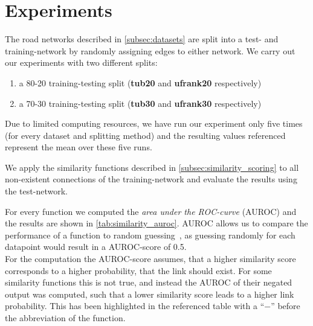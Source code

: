 \documentclass[12pt,a4paper]{IEEEtran}
\newcommand{\n}{\ensuremath{-}}
\begin{document}
\section{Experiments}

The road networks described in \autoref{subsec:datasets} are split into a
test- and training-network by randomly assigning edges to either network.
We carry out our experiments with two different splits:
\begin{enumerate}
\item a 80-20 training-testing split (\textbf{tub20} and \textbf{ufrank20} respectively)
\item a 70-30 training-testing split (\textbf{tub30} and \textbf{ufrank30} respectively)
\end{enumerate}
Due to limited computing resources, we have run our experiment only five times
(for every dataset and splitting method) and the resulting values
referenced represent the mean over these five runs.

We apply the similarity functions described in \autoref{subsec:similarity_scoring}
to all non-existent connections of the training-network and evaluate the results using the test-network.

For every function we computed the \emph{area under the ROC-curve} (AUROC) and the results are shown in \autoref{tab:similarity_auroc}.
AUROC allows us to compare the performance of a function to random guessing~\cite[see][40]{informedness},
as guessing randomly for each datapoint would result in a AUROC-score of 0.5.\\
For the computation the AUROC-score assumes,
that a higher similarity score corresponds to a higher probability, that the link should exist.
For some similarity functions this is not true, and instead the AUROC of their
negated output was computed, such that a lower similarity score leads to a higher link probability.
This has been highlighted in the referenced table with a \enquote{\n{}} before the abbreviation of the function.
\end{document}
